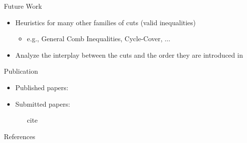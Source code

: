 \documentclass[10pt]{beamer}
\begin{document}
\begin{frame}{Future Work}
\begin{itemize}
\item<1-> Heuristics for many other families of cuts (valid inequalities)
	\begin{itemize}
	\item<2-> e.g., General Comb Inequalities, Cycle-Cover, $\ldots$
	\end{itemize}
\item<3-> Analyze the interplay between the cuts and the order they are introduced in
\end{itemize}
\end{frame}


\begin{frame}{Publication}
\begin{itemize}
    \item Published papers:
    \begin{itemize}
        \item[\cite{KKRS13}]
        \item[\cite{KK16}]
    \end{itemize}
    \item Submitted papers:
    \begin{itemize}
        \item[cite{}]
    \end{itemize}
        
\end{itemize}

\end{frame}

\begin{frame}[allowframebreaks]{References}

	
    

\end{frame}
\end{document}
